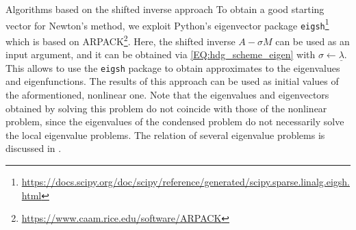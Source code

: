 \documentclass[a4paper, english, 12pt, reqno, draft]{amsart}
\makeatletter
\theoremstyle{definition}
\theoremstyle{remark}
\numberwithin{equation}{section}
\newcommand{\code}[1]{\texttt{#1}}
\newcommand{\eigenval}{\ensuremath{\underline \lambda}}
\def\paragraph{\@startsection{paragraph}{4}%
  \z@\z@{-\fontdimen2\font}%
  {\normalfont\scshape}}
\makeatother
\begin{document}
\paragraph{Algorithms based on the shifted inverse approach}
% 
To obtain a good starting vector for Newton's method, we exploit Python's eigenvector package \code{eigsh}\footnote{\url{https://docs.scipy.org/doc/scipy/reference/generated/scipy.sparse.linalg.eigsh.html}} which is based on ARPACK\footnote{\url{https://www.caam.rice.edu/software/ARPACK}}. Here, the shifted inverse $A - \sigma M$ can be used as an input argument, and it can be obtained via \eqref{EQ:hdg_scheme_eigen} with $\sigma \leftarrow \eigenval$. This allows to use the \code{eigsh} package to obtain approximates to the eigenvalues and eigenfunctions. The results of this approach can be used as initial values of the aformentioned, nonlinear one. Note that the eigenvalues and eigenvectors obtained by solving this problem do not coincide with those of the nonlinear problem, since the eigenvalues of the condensed problem do not necessarily solve the local eigenvalue problems. The relation of several eigenvalue problems is discussed in \cite{GopalakrishnanLNP2014}.
% 
\end{document}
